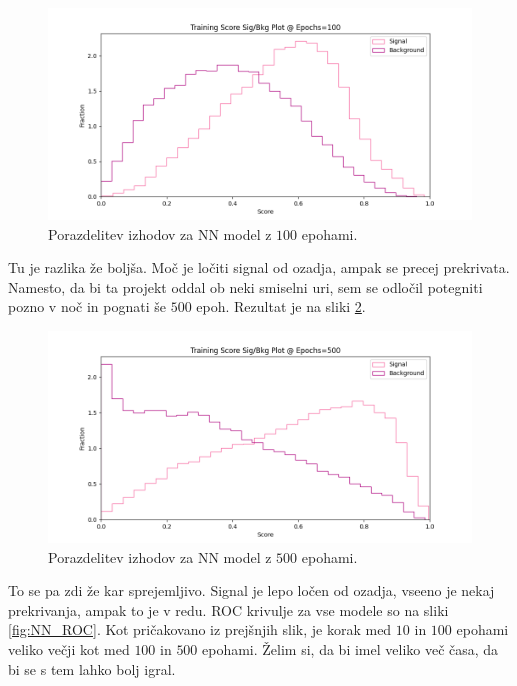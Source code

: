 \documentclass[a4paper]{article}
\begin{document}
\begin{figure}[H]
    \centering
    \includegraphics[width=1\textwidth]{../images/NNsig_bk_100.png}
    \caption{Porazdelitev izhodov za NN model z $100$ epohami.}
    \label{fig:NN_100}
\end{figure}

Tu je razlika že boljša. Moč je ločiti signal od ozadja, ampak se precej prekrivata. Namesto, da bi ta projekt oddal
ob neki smiselni uri, sem se odločil potegniti pozno v noč in pognati še $500$ epoh. Rezultat je na sliki \ref{fig:NN_500}. \\

\begin{figure}[H]
    \centering
    \includegraphics[width=1\textwidth]{../images/NNsig_bk_500.png}
    \caption{Porazdelitev izhodov za NN model z $500$ epohami.}
    \label{fig:NN_500}
\end{figure}

To se pa zdi že kar sprejemljivo. Signal je lepo ločen od ozadja, vseeno je nekaj prekrivanja, ampak to je v redu.
ROC krivulje za vse modele so na sliki \ref{fig:NN_ROC}. Kot pričakovano iz prejšnjih slik, je korak med $10$ in $100$ 
epohami veliko večji kot med $100$ in $500$ epohami. Želim si, da bi imel veliko več časa, da bi se s tem lahko bolj igral. \\
\end{document}
